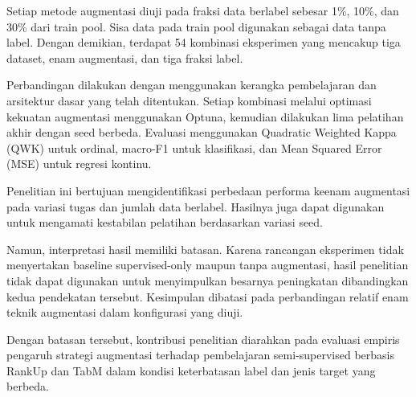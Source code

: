 Setiap metode augmentasi diuji pada fraksi data berlabel sebesar 1\%, 10\%, dan 30\% dari train pool. Sisa data pada train pool digunakan sebagai data tanpa label. Dengan demikian, terdapat 54 kombinasi eksperimen yang mencakup tiga dataset, enam augmentasi, dan tiga fraksi label.

Perbandingan dilakukan dengan menggunakan kerangka pembelajaran dan arsitektur dasar yang telah ditentukan. Setiap kombinasi melalui optimasi kekuatan augmentasi menggunakan Optuna, kemudian dilakukan lima pelatihan akhir dengan seed berbeda. Evaluasi menggunakan Quadratic Weighted Kappa (QWK) untuk ordinal, macro-F1 untuk klasifikasi, dan Mean Squared Error (MSE) untuk regresi kontinu.

Penelitian ini bertujuan mengidentifikasi perbedaan performa keenam augmentasi pada variasi tugas dan jumlah data berlabel. Hasilnya juga dapat digunakan untuk mengamati kestabilan pelatihan berdasarkan variasi seed.

Namun, interpretasi hasil memiliki batasan. Karena rancangan eksperimen tidak menyertakan baseline supervised-only maupun tanpa augmentasi, hasil penelitian tidak dapat digunakan untuk menyimpulkan besarnya peningkatan dibandingkan kedua pendekatan tersebut. Kesimpulan dibatasi pada perbandingan relatif enam teknik augmentasi dalam konfigurasi yang diuji.

Dengan batasan tersebut, kontribusi penelitian diarahkan pada evaluasi empiris pengaruh strategi augmentasi terhadap pembelajaran semi-supervised berbasis RankUp dan TabM dalam kondisi keterbatasan label dan jenis target yang berbeda.


